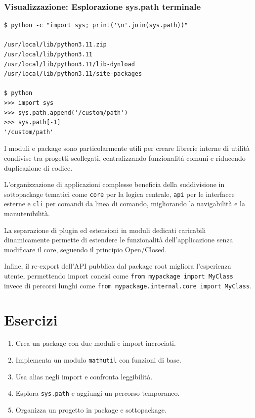 \subsubsection{Visualizzazione: Esplorazione sys.path terminale}
\begin{center}
\begin{tcolorbox}[colback=black!5, colframe=black!75, title=Terminal Output, fonttitle=\ttfamily\bfseries]
\begin{lstlisting}[style=python]
$ python -c "import sys; print('\n'.join(sys.path))"

/usr/local/lib/python3.11.zip
/usr/local/lib/python3.11
/usr/local/lib/python3.11/lib-dynload
/usr/local/lib/python3.11/site-packages

$ python
>>> import sys
>>> sys.path.append('/custom/path')
>>> sys.path[-1]
'/custom/path'
\end{lstlisting}
\end{tcolorbox}
\end{center}

\begin{tcolorbox}[title=Casi d'uso]
I moduli e package sono particolarmente utili per creare librerie interne di utilità condivise tra progetti scollegati, centralizzando funzionalità comuni e riducendo duplicazione di codice.

L'organizzazione di applicazioni complesse beneficia della suddivisione in sottopackage tematici come \texttt{core} per la logica centrale, \texttt{api} per le interfacce esterne e \texttt{cli} per comandi da linea di comando, migliorando la navigabilità e la manutenibilità.

La separazione di plugin ed estensioni in moduli dedicati caricabili dinamicamente permette di estendere le funzionalità dell'applicazione senza modificare il core, seguendo il principio Open/Closed.

Infine, il re-export dell'API pubblica dal package root migliora l'esperienza utente, permettendo import concisi come \verb|from mypackage import MyClass| invece di percorsi lunghi come \verb|from mypackage.internal.core import MyClass|.
\end{tcolorbox}

\section{Esercizi}
\begin{enumerate}
  \item Crea un package con due moduli e import incrociati.
  \item Implementa un modulo \texttt{mathutil} con funzioni di base.
  \item Usa alias negli import e confronta leggibilità.
  \item Esplora \texttt{sys.path} e aggiungi un percorso temporaneo.
  \item Organizza un progetto in package e sottopackage.
\end{enumerate}

